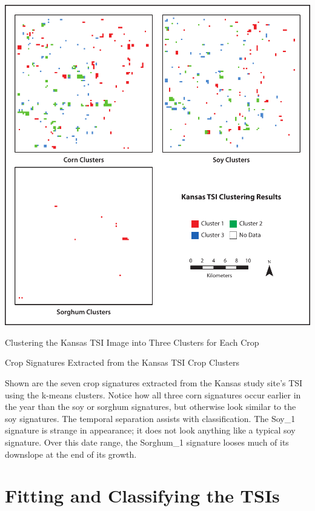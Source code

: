 \begin{ssfigure}
  \centering
  \includegraphics[width=\textwidth]{Graphics/KSclustered.pdf}
  \caption{Clustering the Kansas TSI Image into Three Clusters for Each Crop}
  \label{map:KSclusters}
\end{ssfigure}


\begin{ssfigure}
  \centering
  
  \caption{Crop Signatures Extracted from the Kansas TSI Crop Clusters}
  \medskip
  \small
  Shown are the seven crop signatures extracted from the Kansas study site's TSI using the k-means clusters. Notice how all three corn signatures occur earlier in the year than the soy or sorghum signatures, but otherwise look similar to the soy signatures. The temporal separation assists with classification. The Soy\_1 signature is strange in appearance; it does not look anything like a typical soy signature. Over this date range, the Sorghum\_1 signature looses much of its downslope at the end of its growth.
  \label{fig:KScropsigs}
\end{ssfigure}


\section{Fitting and Classifying the TSIs}

